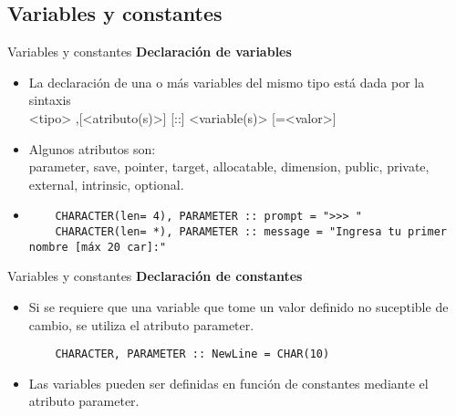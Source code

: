
\subsection{Variables y constantes}

\begin{frame}[fragile]{Variables y constantes}
\textbf{Declaración de variables}
 \begin{itemize}[<+(1)->]
  \item La declaración de una o más variables del mismo tipo está dada por la sintaxis\\ 
   \centering <tipo> ,[<atributo(s)>] [::] <variable(s)> [=<valor>]
  \item Algunos atributos son:\\ 
  parameter, save, pointer, target, allocatable, dimension, public, private, external, intrinsic, optional.
  \vspace{6pt}
  \item []
   \begin{verbatim}
    CHARACTER(len= 4), PARAMETER :: prompt = ">>> "
    CHARACTER(len= *), PARAMETER :: message = "Ingresa tu primer nombre [máx 20 car]:"
   \end{verbatim}
 \end{itemize}
\end{frame}

\begin{frame}[fragile]{Variables y constantes}
\textbf{Declaración de constantes}
 \begin{itemize}[<+(1)->]
  \item Si se requiere que una variable que tome un valor definido no suceptible de cambio, se utiliza el atributo parameter. \\ 
   \begin{verbatim}
    CHARACTER, PARAMETER :: NewLine = CHAR(10)
   \end{verbatim}
   \vspace{-3pt}
   \item Las variables pueden ser definidas en función de constantes mediante el atributo parameter.
 \end{itemize}
\end{frame}
